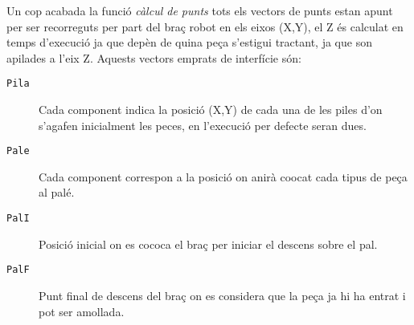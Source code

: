 Un cop acabada la funció \emph{càlcul de punts} tots els vectors de punts estan apunt
per ser recorreguts per part del braç robot en els eixos (X,Y), el Z és
calculat en temps d'execució ja que depèn de quina peça s'estigui tractant,
ja que son apilades a l'eix Z.
Aquests vectors emprats de interfície són:

\begin{description}
 \item [\texttt{Pila}] Cada component indica la posició (X,Y) de cada una de
les piles d'on s'agafen
inicialment les peces, en l'execució per defecte seran dues.
 \item [\texttt{Pale}] Cada component correspon a la posició on anirà
co\lgem ocat cada tipus de peça al palé.
 \item [\texttt{PalI}] Posició inicial on es co\lgem coca el braç per iniciar
el descens sobre el pal.
 \item [\texttt{PalF}] Punt final de descens del braç on es considera que la
peça ja hi ha entrat i pot ser amollada.
\end{description}

